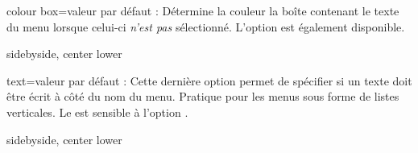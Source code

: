 \documentclass[10pt,french,a4paper]{article}
\newcommand*\Couleur[1]{L'option \docAuxKey{color #1} est également disponible.\xspace}
\begin{document}
\begin{docKey}{colour box}{=}{valeur par défaut : }
    Détermine la couleur la boîte contenant le texte du menu lorsque celui-ci \textit{n'est pas} sélectionné. \Couleur{box}
\end{docKey}

\begin{dispExample*}{sidebyside, center lower}
 
\end{dispExample*}
\medbreak

\begin{docKey}{text}{=}{valeur par défaut : }
    Cette dernière option permet de spécifier si un texte doit être écrit à côté du nom du menu. Pratique pour les menus sous forme de listes verticales. Le  est sensible à l'option .
\end{docKey}

\begin{dispExample*}{sidebyside, center lower}
\par
{}\par
{}
\end{dispExample*}
\end{document}
